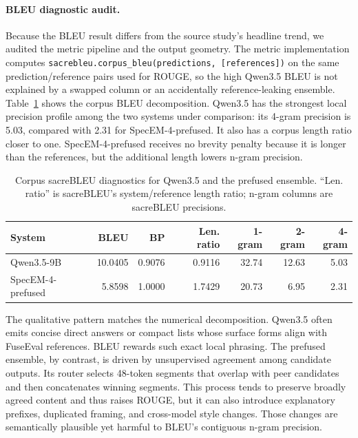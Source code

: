 \documentclass[11pt]{article}
\begin{document}
\paragraph{BLEU diagnostic audit.} Because the BLEU result differs from the source study's headline trend, we audited the metric pipeline and the output geometry. The metric implementation computes \texttt{sacrebleu.corpus\_bleu(predictions, [references])} on the same prediction/reference pairs used for ROUGE, so the high Qwen3.5 BLEU is not explained by a swapped column or an accidentally reference-leaking ensemble. Table~\ref{tab:bleu-diagnostics} shows the corpus BLEU decomposition. Qwen3.5 has the strongest local precision profile among the two systems under comparison: its 4-gram precision is 5.03, compared with 2.31 for SpecEM-4-prefused. It also has a corpus length ratio closer to one. SpecEM-4-prefused receives no brevity penalty because it is longer than the references, but the additional length lowers n-gram precision.

\begin{table}[h]
\centering
\begin{tabular}{lrrrrrr}
\toprule
System & BLEU & BP & Len. ratio & 1-gram & 2-gram & 4-gram \\
\midrule
Qwen3.5-9B & 10.0405 & 0.9076 & 0.9116 & 32.74 & 12.63 & 5.03 \\
SpecEM-4-prefused & 5.8598 & 1.0000 & 1.7429 & 20.73 & 6.95 & 2.31 \\
\bottomrule
\end{tabular}
\caption{Corpus sacreBLEU diagnostics for Qwen3.5 and the prefused ensemble. ``Len. ratio'' is sacreBLEU's system/reference length ratio; n-gram columns are sacreBLEU precisions.}
\label{tab:bleu-diagnostics}
\end{table}

The qualitative pattern matches the numerical decomposition. Qwen3.5 often emits concise direct answers or compact lists whose surface forms align with FuseEval references. BLEU rewards such exact local phrasing. The prefused ensemble, by contrast, is driven by unsupervised agreement among candidate outputs. Its router selects 48-token segments that overlap with peer candidates and then concatenates winning segments. This process tends to preserve broadly agreed content and thus raises ROUGE, but it can also introduce explanatory prefixes, duplicated framing, and cross-model style changes. Those changes are semantically plausible yet harmful to BLEU's contiguous n-gram precision.
\end{document}
